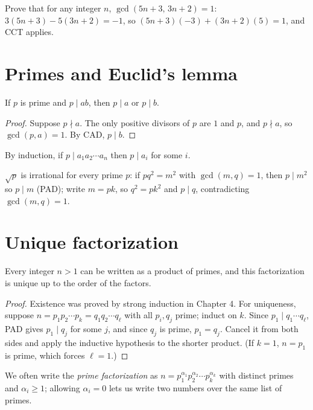 \begin{example}
Prove that for any integer $n$, $\gcd(5n+3,\, 3n+2) = 1$: $3(5n+3) - 5(3n+2) = -1$, so
$(5n+3)(-3) + (3n+2)(5) = 1$, and CCT applies.
\end{example}

\section{Primes and Euclid's lemma}

\begin{theorem}
If $p$ is prime and $p \mid ab$, then $p \mid a$ or $p \mid b$.
\end{theorem}
\begin{proof}
Suppose $p \nmid a$. The only positive divisors of $p$ are $1$ and $p$, and $p \nmid a$, so
$\gcd(p,a) = 1$. By CAD, $p \mid b$.
\end{proof}

By induction, if $p \mid a_1a_2\cdots a_n$ then $p \mid a_i$ for some $i$.

\begin{example}
$\sqrt p$ is irrational for every prime $p$: if $p q^2 = m^2$ with $\gcd(m,q) = 1$, then
$p \mid m^2$ so $p \mid m$ (PAD); write $m = pk$, so $q^2 = pk^2$ and $p \mid q$, contradicting
$\gcd(m,q) = 1$.
\end{example}

\section{Unique factorization}

\begin{theorem}
Every integer $n > 1$ can be written as a product of primes, and this factorization is
unique up to the order of the factors.
\end{theorem}
\begin{proof}
Existence was proved by strong induction in Chapter 4. For uniqueness, suppose
$n = p_1p_2\cdots p_k = q_1q_2 \cdots q_\ell$ with all $p_i,q_j$ prime; induct on $k$. Since
$p_1 \mid q_1\cdots q_\ell$, PAD gives $p_1 \mid q_j$ for some $j$, and since $q_j$ is prime,
$p_1 = q_j$. Cancel it from both sides and apply the inductive hypothesis to the shorter
product. (If $k = 1$, $n = p_1$ is prime, which forces $\ell = 1$.)
\end{proof}

We often write the \emph{prime factorization} as $n = p_1^{\alpha_1}p_2^{\alpha_2}\cdots
p_k^{\alpha_k}$ with distinct primes and $\alpha_i \geq 1$; allowing $\alpha_i = 0$ lets us
write two numbers over the same list of primes.

